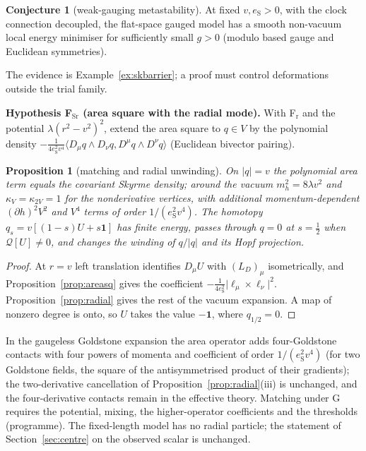 \documentclass[aps,pra,onecolumn,superscriptaddress,nofootinbib,10pt]{revtex4-2}
\newtheorem{proposition}[theorem]{Proposition}
\theoremstyle{definition}
\newtheorem{conjecture}[theorem]{Conjecture}
\theoremstyle{remark}
\newcommand{\ip}[2]{\langle #1,#2\rangle}
\begin{document}
\begin{conjecture}[weak-gauging metastability]\label{conj:metastable}
At fixed $v,e_{\mathrm S}>0$, with the clock connection decoupled, the flat-space gauged model has a smooth non-vacuum
local energy minimiser for sufficiently small $g>0$ (modulo based gauge and Euclidean symmetries).
\end{conjecture}
\noindent The evidence is Example~\ref{ex:skbarrier}; a proof must control deformations outside the trial family.

\smallskip\noindent\textbf{Hypothesis F$_{\mathrm{Sr}}$ (area square with the radial mode).}  With F$_{\mathrm r}$ and the potential $\lambda(r^2-v^2)^2$, extend
the area square to $q\in V$ by the polynomial density $-\frac1{4e_{\mathrm S}^2v^4}\ip{D_\mu q\wedge D_\nu q}{D^\mu q\wedge D^\nu q}$ (Euclidean bivector pairing).

\begin{proposition}[matching and radial unwinding]\label{prop:skradial}
On $\lvert q\rvert=v$ the polynomial area term equals the covariant Skyrme density; around the vacuum $m_h^2=8\lambda v^2$ and
$\kappa_V=\kappa_{2V}=1$ for the nonderivative vertices, with additional momentum-dependent $(\partial h)^2V^2$ and $V^4$ terms of order
$1/(e_{\mathrm S}^2v^4)$.  The homotopy $q_s=v[(1-s)U+s\mathbf1]$ has finite energy, passes through $q=0$ at $s=\tfrac12$ when $\mathcal Q[U]\ne0$, and
changes the winding of $q/\lvert q\rvert$ and its Hopf projection.
\end{proposition}
\begin{proof}
At $r=v$ left translation identifies $D_\mu U$ with $(L_D)_\mu$ isometrically, and Proposition~\ref{prop:areasq} gives the
coefficient $-\frac1{4e_{\mathrm S}^2}\lvert\ell_\mu\times\ell_\nu\rvert^2$.  Proposition~\ref{prop:radial} gives the rest of the vacuum expansion.  A map of
nonzero degree is onto, so $U$ takes the value $-\mathbf1$, where $q_{1/2}=0$.
\end{proof}
\noindent In the gaugeless Goldstone expansion the area operator adds four-Goldstone contacts with four powers
of momenta and coefficient of order $1/(e_{\mathrm S}^2v^4)$ (for two Goldstone fields, the square of the antisymmetrised
product of their gradients); the two-derivative cancellation of Proposition~\ref{prop:radial}(iii) is unchanged,
and the four-derivative contacts remain in the effective theory.  Matching under G requires the
potential, mixing, the higher-operator coefficients and the thresholds (programme).  The fixed-length
model has no radial particle; the statement of Section~\ref{sec:centre} on the observed scalar is unchanged.
\end{document}
